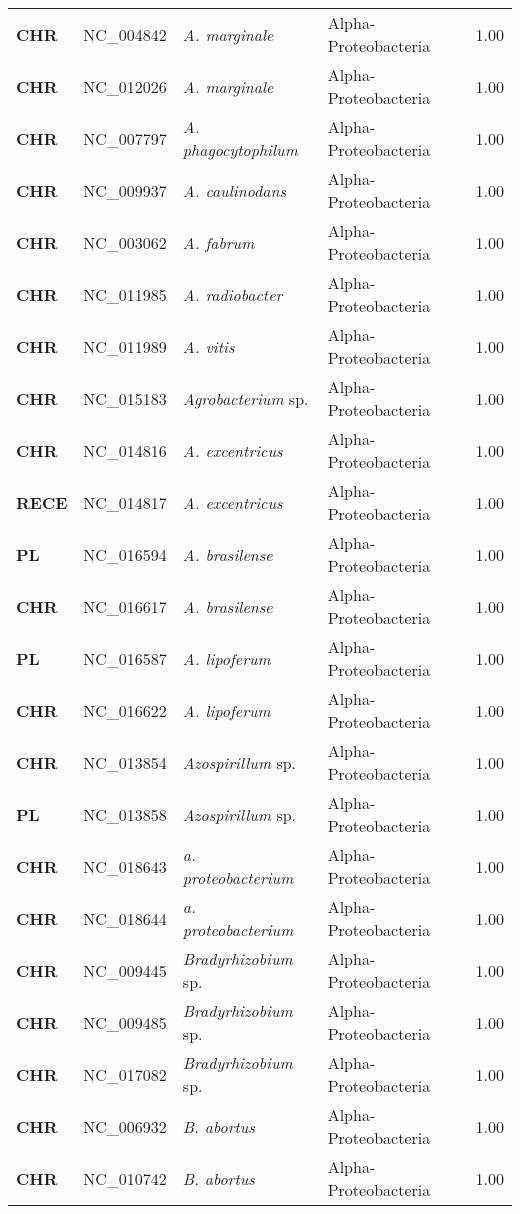 \begin{adjustwidth}{-3cm}{2cm}
{\begin{supertabular}{>{\bfseries}l|p{0.1\textwidth}p{0.14\textwidth}l|l}
CHR & NC\_004842 & \textit{A. marginale} & Alpha-Proteobacteria & 1.00\\
CHR & NC\_012026 & \textit{A. marginale} & Alpha-Proteobacteria & 1.00\\
CHR & NC\_007797 & \textit{A. phagocytophilum} & Alpha-Proteobacteria & 1.00\\
CHR & NC\_009937 & \textit{A. caulinodans} & Alpha-Proteobacteria & 1.00\\
CHR & NC\_003062 & \textit{A. fabrum} & Alpha-Proteobacteria & 1.00\\
CHR & NC\_011985 & \textit{A. radiobacter} & Alpha-Proteobacteria & 1.00\\
CHR & NC\_011989 & \textit{A. vitis} & Alpha-Proteobacteria & 1.00\\
CHR & NC\_015183 & \textit{Agrobacterium} sp. & Alpha-Proteobacteria & 1.00\\
CHR & NC\_014816 & \textit{A. excentricus} & Alpha-Proteobacteria & 1.00\\
RECE & NC\_014817 & \textit{A. excentricus} & Alpha-Proteobacteria & 1.00\\
PL & NC\_016594 & \textit{A. brasilense} & Alpha-Proteobacteria & 1.00\\
CHR & NC\_016617 & \textit{A. brasilense} & Alpha-Proteobacteria & 1.00\\
PL & NC\_016587 & \textit{A. lipoferum} & Alpha-Proteobacteria & 1.00\\
CHR & NC\_016622 & \textit{A. lipoferum} & Alpha-Proteobacteria & 1.00\\
CHR & NC\_013854 & \textit{Azospirillum} sp. & Alpha-Proteobacteria & 1.00\\
PL & NC\_013858 & \textit{Azospirillum} sp. & Alpha-Proteobacteria & 1.00\\
CHR & NC\_018643 & \textit{a. proteobacterium} & Alpha-Proteobacteria & 1.00\\
CHR & NC\_018644 & \textit{a. proteobacterium} & Alpha-Proteobacteria & 1.00\\
CHR & NC\_009445 & \textit{Bradyrhizobium} sp. & Alpha-Proteobacteria & 1.00\\
CHR & NC\_009485 & \textit{Bradyrhizobium} sp. & Alpha-Proteobacteria & 1.00\\
CHR & NC\_017082 & \textit{Bradyrhizobium} sp. & Alpha-Proteobacteria & 1.00\\
CHR & NC\_006932 & \textit{B. abortus} & Alpha-Proteobacteria & 1.00\\
CHR & NC\_010742 & \textit{B. abortus} & Alpha-Proteobacteria & 1.00\\

\end{supertabular}}
\end{adjustwidth}
